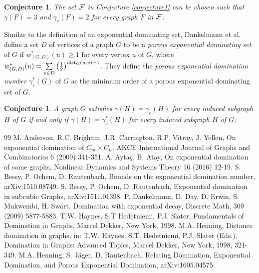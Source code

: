 \documentclass[12pt]{article}
\newtheorem{conjecture}[theorem]{Conjecture}
\begin{document}
\begin{conjecture}\label{conjecture2}
The set ${\cal F}$ in Conjecture \ref{conjecture1} can be chosen such that 
$\gamma(F)=3$ and $\gamma_e(F)=2$ for every graph $F$ in ${\cal F}$.
\end{conjecture}
Similar to the definition of an exponential dominating set, 
Dankelmann et al.~\cite{ddems} define a set $D$ of vertices of a graph $G$ 
to be a {\it porous exponential dominating set} of $G$ if
$w^*_{(G,D)}(u)\geq 1$ for every vertex $u$ of $G$, 
where
$w^*_{(G,D)}(u)=\sum\limits_{v\in D}\left(\frac{1}{2}\right)^{{\rm dist}_G(u,v)-1}$.
They define the {\it porous exponential domination number $\gamma^*_e(G)$} of $G$ 
as the minimum order of a porous exponential dominating set of $G$.
\begin{conjecture}\label{conjecture3}
A graph $G$ satisfies
$\gamma(H)=\gamma_e(H)$ for every induced subgraph $H$ of $G$
if and only if
$\gamma(H)=\gamma_e^*(H)$ for every induced subgraph $H$ of $G$.
\end{conjecture}

\begin{thebibliography}{99}
 M. Anderson, R.C. Brigham, J.R. Carrington, R.P. Vitray, J. Yellen, On exponential domination of $C_m\times C_n$, AKCE International Journal of Graphs and Combinatorics 6 (2009) 341-351.
 A. Ayta\c{c}, B. Atay, On exponential domination of some graphs, Nonlinear Dynamics and Systems Theory 16 (2016) 12-19.
 S. Bessy, P. Ochem, D. Rautenbach, Bounds on the exponential domination number, arXiv:1510.08749.
 S. Bessy, P. Ochem, D. Rautenbach, Exponential domination in subcubic Graphs, arXiv:1511.01398.
 P. Dankelmann, D. Day, D. Erwin, S. Mukwembi, H. Swart, Domination with exponential decay, Discrete Math. 309 (2009) 5877-5883.
 T.W. Haynes, S.T Hedetniemi, P.J. Slater, Fundamentals of Domination in Graphs, Marcel Dekker, New York, 1998.
 M.A. Henning, Distance domination in graphs, in: T.W. Haynes, S.T. Hedetniemi, P.J. Slater (Eds.), Domination in Graphs: Advanced Topics, Marcel Dekker, New York, 1998, 321-349.
 M.A. Henning, S. J\"{a}ger, D. Rautenbach, Relating Domination, Exponential Domination, and Porous Exponential Domination, arXiv:1605.04575.
\end{thebibliography}
\end{document}
